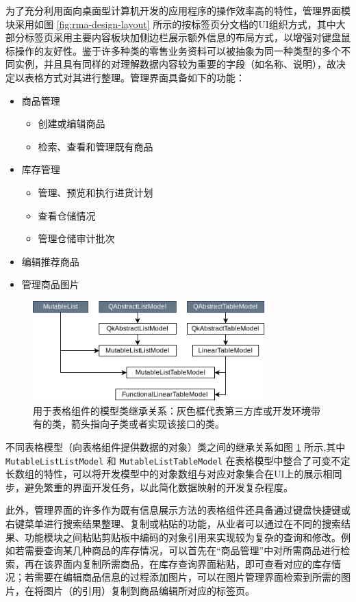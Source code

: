 为了充分利用面向桌面型计算机开发的应用程序的操作效率高的特性，管理界面模块采用如图 \ref{fig:rma-design-layout} 所示的按标签页分文档的UI组织方式，其中大部分标签页采用主要内容板块加侧边栏展示额外信息的布局方式，以增强对键盘鼠标操作的友好性。鉴于许多种类的零售业务资料可以被抽象为同一种类型的多个不同实例，并且具有同样的对理解数据内容较为重要的字段（如名称、说明），故决定以表格方式对其进行整理。管理界面具备如下的功能：

\begin{itemize}
	\item 商品管理
	\begin{itemize}
		\item 创建或编辑商品
		\item 检索、查看和管理既有商品
	\end{itemize}
	\item 库存管理
	\begin{itemize}
		\item 管理、预览和执行进货计划
		\item 查看仓储情况
		\item 管理仓储审计批次
	\end{itemize}
	\item 编辑推荐商品
	\item 管理商品图片
\end{itemize}

\begin{figure}[htbp]
	\centering
	\includegraphics[width=0.8\textwidth]{./imgs/rma-tables.png}
	\caption{用于表格组件的模型类继承关系：灰色框代表第三方库或开发环境带有的类，箭头指向子类或者实现该接口的类。}
	\label{fig:rma-tables}
\end{figure}

不同表格模型（向表格组件提供数据的对象）类之间的继承关系如图 \ref{fig:rma-tables} 所示,其中 \verb|MutableListListModel| 和 \verb|MutableListTableModel| 在表格模型中整合了可变不定长数组的特性，可以将开发模型中的对象数组与对应对象集合在UI上的展示相同步，避免繁重的界面开发任务，以此简化数据映射的开发复杂程度。

此外，管理界面的许多作为既有信息展示方法的表格组件还具备通过键盘快捷键或右键菜单进行搜索结果整理、复制或粘贴的功能，从业者可以通过在不同的搜索结果、功能模块之间粘贴剪贴板中编码的对象引用来实现较为复杂的查询和修改。例如若需要查询某几种商品的库存情况，可以首先在“商品管理”中对所需商品进行检索，再在该界面内复制所需商品，在库存查询界面粘贴，即可查看对应的库存情况；若需要在编辑商品信息的过程添加图片，可以在图片管理界面检索到所需的图片，在将图片（的引用）复制到商品编辑所对应的标签页。

